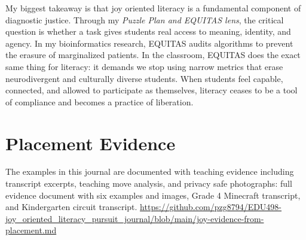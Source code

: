 \documentclass[11pt]{article}
\begin{document}
My biggest takeaway is that joy oriented literacy is a fundamental component of diagnostic justice. Through my \textit{Puzzle Plan and EQUITAS lens}, the critical question is whether a task gives students real access to meaning, identity, and agency. In my bioinformatics research, EQUITAS audits algorithms to prevent the erasure of marginalized patients. In the classroom, EQUITAS does the exact same thing for literacy: it demands we stop using narrow metrics that erase neurodivergent and culturally diverse students. When students feel capable, connected, and allowed to participate as themselves, literacy ceases to be a tool of compliance and becomes a practice of liberation.

\section*{Placement Evidence}

The examples in this journal are documented with teaching evidence including transcript excerpts, teaching move analysis, and privacy safe photographs: full evidence document with six examples and images, Grade 4 Minecraft transcript, and Kindergarten circuit transcript. \url{https://github.com/pzg8794/EDU498-joy_oriented_literacy_pursuit_journal/blob/main/joy-evidence-from-placement.md}
\end{document}
